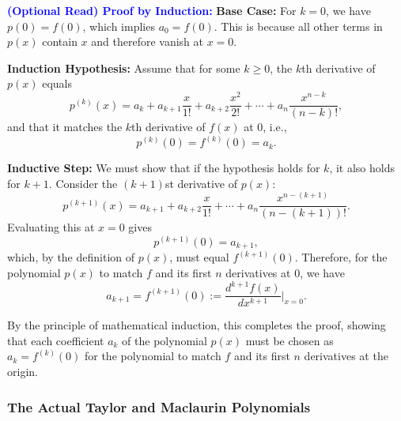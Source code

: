 \textcolor{blue}{\bf (Optional Read) Proof by Induction:} \textbf{Base Case:} For \(k=0\), we have \(p(0) = f(0)\), which implies \(a_0 = f(0)\). This is because all other terms in \(p(x)\) contain \(x\) and therefore vanish at \(x=0\).

\textbf{Induction Hypothesis:}  Assume that for some \(k \geq 0\), the \(k\)th derivative of \(p(x)\) equals
\[
p^{(k)}(x) = a_k + a_{k+1} \frac{x}{1!} + a_{k+2} \frac{x^2}{2!} + \cdots + a_n \frac{x^{n-k}}{(n-k)!},
\]
and that it matches the \(k\)th derivative of \(f(x)\) at \(0\), i.e.,
\[
p^{(k)}(0) = f^{(k)}(0) = a_k.
\]

\textbf{Inductive Step:} We must show that if the hypothesis holds for \(k\), it also holds for \(k+1\). Consider the \((k+1)\)st derivative of \(p(x)\):
\[
p^{(k+1)}(x) = a_{k+1} + a_{k+2} \frac{x}{1!} + \cdots + a_n \frac{x^{n-(k+1)}}{(n-(k+1))!}.
\]
Evaluating this at \(x=0\) gives
\[
p^{(k+1)}(0) = a_{k+1},
\]
which, by the definition of \(p(x)\), must equal \(f^{(k+1)}(0)\). Therefore, for the polynomial \(p(x)\) to match \(f\) and its first \(n\) derivatives at \(0\), we have
\[
a_{k+1} = f^{(k+1)}(0):=\frac{d^{k+1} f(x)}{dx^{k+1}} \Big|_{x=0}.
\]

By the principle of mathematical induction, this completes the proof, showing that each coefficient \(a_k\) of the polynomial \(p(x)\) must be chosen as \(a_k = f^{(k)}(0)\) for the polynomial to match \(f\) and its first \(n\) derivatives at the origin.


 \Qed

 \subsubsection{The Actual Taylor and Maclaurin Polynomials}



\vspace*{.2cm}

